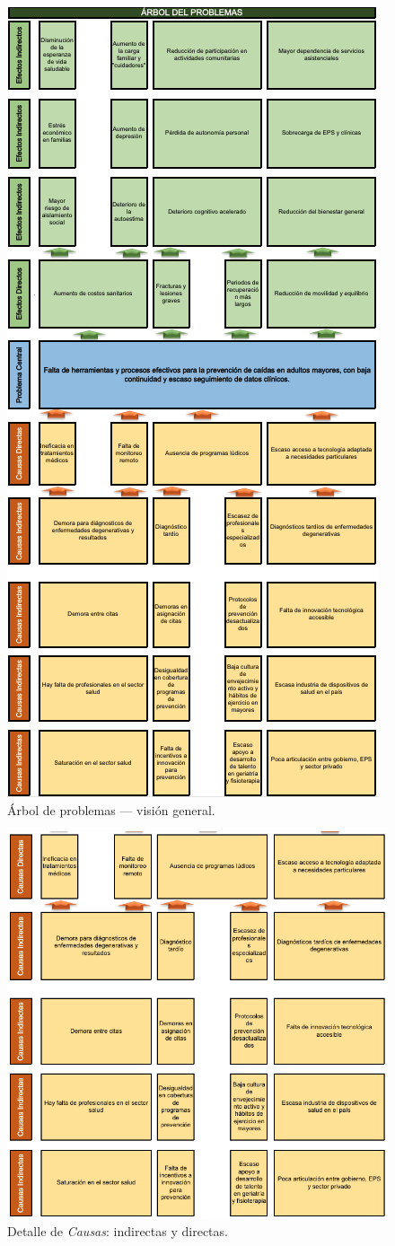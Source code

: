\begin{figure}[H]\centering
\includegraphics[width=.35\linewidth]{Figures/Arbol_Problemas/00_arbol_problemas_general.png}
\caption{Árbol de problemas — visión general.}
\end{figure}

\begin{figure}[H]\centering
\includegraphics[width=.95\linewidth]{Figures/Arbol_Problemas/01_causas_directas_indirectas.png}
\caption{Detalle de \emph{Causas}: indirectas y directas.}
\end{figure}

